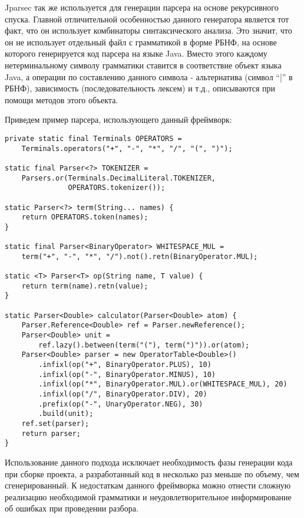 Jparsec так же используется для генерации парсера на основе рекурсивного спуска.
Главной отличительной особенностью данного генератора является тот факт, что он
использует комбинаторы синтаксического анализа. Это значит, что он не использует
отдельный файл с грамматикой в форме РБНФ, на основе которого генерируется код
парсера на языке Java. Вместо этого каждому нетерминальному символу грамматики
ставится в соответствие объект языка Java, а операции по составлению данного
символа - альтернатива (символ ``|'' в РБНФ), зависимость (последовательность
лексем) и т.д., описываются при помощи методов этого объекта.

Приведем пример парсера, использующего данный фреймворк:

\begin{lstlisting}[caption={Пример парсера, использующего фреймворк Jparsec}]
private static final Terminals OPERATORS =
    Terminals.operators("+", "-", "*", "/", "(", ")");

static final Parser<?> TOKENIZER =
    Parsers.or(Terminals.DecimalLiteral.TOKENIZER,
               OPERATORS.tokenizer());

static Parser<?> term(String... names) {
    return OPERATORS.token(names);
}

static final Parser<BinaryOperator> WHITESPACE_MUL =
    term("+", "-", "*", "/").not().retn(BinaryOperator.MUL);

static <T> Parser<T> op(String name, T value) {
    return term(name).retn(value);
}

static Parser<Double> calculator(Parser<Double> atom) {
    Parser.Reference<Double> ref = Parser.newReference();
    Parser<Double> unit =
        ref.lazy().between(term("("), term(")")).or(atom);
    Parser<Double> parser = new OperatorTable<Double>()
        .infixl(op("+", BinaryOperator.PLUS), 10)
        .infixl(op("-", BinaryOperator.MINUS), 10)
        .infixl(op("*", BinaryOperator.MUL).or(WHITESPACE_MUL), 20)
        .infixl(op("/", BinaryOperator.DIV), 20)
        .prefix(op("-", UnaryOperator.NEG), 30)
        .build(unit);
    ref.set(parser);
    return parser;
}
\end{lstlisting}

Использование данного подхода исключает необходимость фазы генерации кода при
сборке проекта, а разработанный код в несколько раз меньше по объему, чем
сгенерированный. К недостаткам данного фреймворка можно отнести сложную
реализацию необходимой грамматики и неудовлетворительное информирование об
ошибках при проведении разбора.


